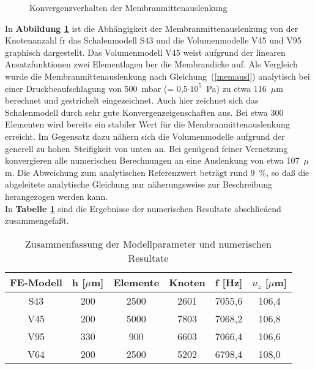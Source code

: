 \begin{figure}[htb]
\begin{center}

\setabbvze
\end{center}
\caption{\label{abbkonvausl}
 Konvergenzverhalten der Membranmittenauslenkung}
\end{figure}
In {\bf Abbildung \ref{abbkonvausl}} ist die Abhängigkeit der
Membranmittenauslenkung von der
Knotenanzahl fr das Schalenmodell S43 und die Volumenmodelle
V45 und V95 graphisch dargestellt. Das Volumenmodell V45 weist
aufgrund der linearen Ansatzfunktionen zwei Elementlagen ber
die Membrandicke auf. Als Vergleich wurde die Membranmittenauslenkung
nach Gleichung~(\ref{memausl}) analytisch bei einer Druckbeaufschlagung
von 500~mbar (= 0,5$\cdot 10^{5}$~Pa) zu etwa 116~$\mu$m berechnet und
gestrichelt eingezeichnet. Auch hier zeichnet sich das Schalenmodell
durch sehr gute Konvergenzeigenschaften aus. Bei etwa 300 Elementen wird
bereits ein stabiler Wert für die Membranmittenauslenkung
erreicht. Im Gegensatz dazu nähern sich die Volumenmodelle
aufgrund der generell zu \glqq hohen\grqq \, Steifigkeit von
unten an. Bei genügend feiner Vernetzung konvergieren alle numerischen
Berechnungen an eine Auslenkung von etwa 107~$\mu$m. Die Abweichung
zum analytischen Referenzwert beträgt rund 9~\%, so daß die abgeleitete
analytische Gleichung nur näherungsweise zur Beschreibung herangezogen
werden kann.\\
%
In {\bf Tabelle \ref{tabfreqzus}} sind die Ergebnisse der numerischen
Resultate abschlieáend zusammengefaßt.
\begin{table}[htb]
\caption{\label{tabfreqzus}
 Zusammenfassung der Modellparameter und numerischen Resultate}
\begin{center}
\begin{tabular} {|c||c|c|c||c|c|}
\hline
FE-Modell & h [$\mu$m] & Elemente & Knoten & f [Hz] & $u_{z}$ [$\mu$m] \\
\hline \hline
S43  & 200 &  2500  & 2601  & 7055,6  & 106,4 \\
V45  & 200 &  5000  & 7803  & 7068,2  & 106,8 \\
V95  & 330 &  900   & 6603  & 7066,4  & 106,6 \\
\hline
V64  & 200 &  2500  & 5202  & 6798,4  & 108,0 \\
\hline
\end{tabular}\\
\end{center}
\end{table}
